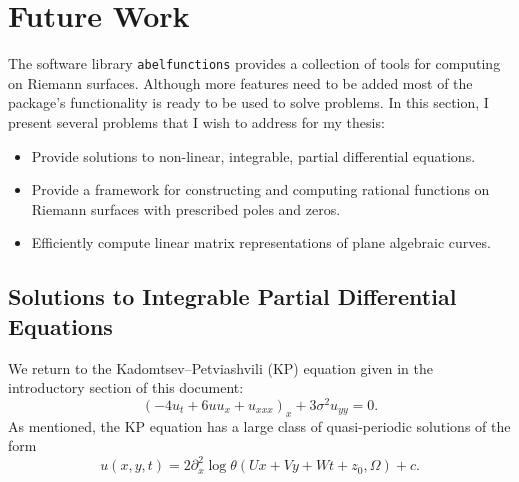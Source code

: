 \section{Future Work}

The software library {\tt abelfunctions} provides a collection of tools
for computing on Riemann surfaces. Although more features need to be
added most of the package's functionality is ready to be used to solve
problems. In this section, I present several problems that I wish to
address for my thesis:
\begin{itemize}
  \item Provide solutions to non-linear, integrable, partial
    differential equations.
  \item Provide a framework for constructing and computing rational
    functions on Riemann surfaces with prescribed poles and zeros.
  \item Efficiently compute linear matrix representations of plane
    algebraic curves.
\end{itemize}



\subsection{Solutions to Integrable Partial Differential Equations}



We return to the Kadomtsev--Petviashvili (KP) equation given in the
introductory section of this document:
\begin{equation*}
    \left(-4u_t + 6uu_x + u_{xxx}\right)_x + 3\sigma^2 u_{yy} = 0.
\end{equation*}
As mentioned, the KP equation has a large class of quasi-periodic solutions of
the form
\begin{equation}\label{eqn: solnformula}
    u(x,y,t)
    =
    2 \partial_x^2 \log \theta(Ux + Vy + Wt + z_0, \Omega) + c.
\end{equation}

